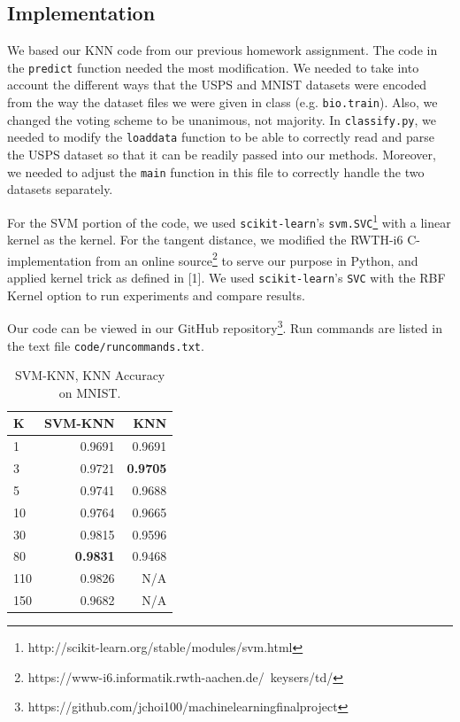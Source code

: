 \documentclass[11pt,letterpaper]{article}
\begin{document}
\subsection{Implementation}

We based our KNN code from our previous homework assignment. The code in the {\tt predict} function needed the most modification. We needed to take into account the different ways that the USPS and MNIST datasets were encoded from the way the dataset files we were given in class (e.g. {\tt bio.train}). Also, we changed the voting scheme to be unanimous, not majority. In {\tt classify.py}, we needed to modify the {\tt load\textunderscore data} function to be able to correctly read and parse the USPS dataset so that it can be readily passed into our methods. Moreover, we needed to adjust the {\tt main} function in this file to correctly handle the two datasets separately.


For the SVM portion of the code, we used {\tt scikit-learn}'s {\tt svm.SVC}\footnote{http://scikit-learn.org/stable/modules/svm.html} with a linear kernel as the kernel. For the tangent distance, we modified the RWTH-i6 C-implementation from an online source\footnote{https://www-i6.informatik.rwth-aachen.de/~keysers/td/} to serve our purpose in Python, and applied kernel trick as defined in [1]. We used {\tt scikit-learn}'s {\tt SVC} with the RBF Kernel option to run experiments and compare results.


Our code can be viewed in our GitHub repository\footnote{https://github.com/jchoi100/machine\textunderscore learning\textunderscore final\textunderscore project}. Run commands are listed in the text file {\tt code/run\textunderscore commands.txt}.

\begin{table}
\begin{center}
\begin{tabular}{|l|r|r|}
\hline \bf K & \bf SVM-KNN & \bf KNN\\ \hline
1 & 0.9691 & 0.9691 \\
3 & 0.9721 & \textbf{0.9705} \\
5 & 0.9741 & 0.9688 \\
10 & 0.9764 & 0.9665 \\
30 & 0.9815 & 0.9596 \\
80 & \textbf{0.9831} & 0.9468 \\
110 & 0.9826& N/A \\
150 & 0.9682 & N/A \\
\hline
\end{tabular}
\end{center}
\caption{\label{svm-knn-mnist} SVM-KNN, KNN Accuracy on MNIST. }
\end{table}
\end{document}
